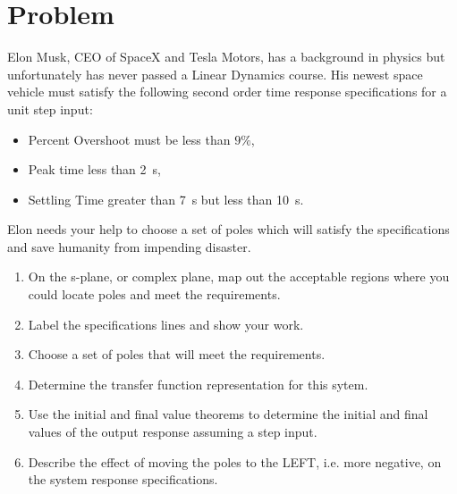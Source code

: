 \documentclass[titlepage, 11pt, reqno]{article}    %
\begin{document}
\section{Problem}\label{prob:sys_response_to_poles}
Elon Musk, CEO of SpaceX and Tesla Motors, has a background in physics but unfortunately has never passed a Linear Dynamics course. 
His newest space vehicle must satisfy the following second order time response specifications for a unit step input:
\begin{itemize}
    \item Percent Overshoot must be less than \(9 \%\),
    \item Peak time less than \SI{2}{\second},
    \item Settling Time greater than \SI{7}{\second} but less than \SI{10}{\second}.
\end{itemize}
Elon needs your help to choose a set of poles which will satisfy the specifications and save humanity from impending disaster.
\begin{enumerate}
    \item On the s-plane, or complex plane, map out the acceptable regions where you could locate poles and meet the requirements. 
    \item Label the specifications lines and show your work.
    \item Choose a set of poles that will meet the requirements.
    \item Determine the transfer function representation for this sytem.
    \item Use the initial and final value theorems to determine the initial and final values of the output response assuming a step input.
    \item Describe the effect of moving the poles to the LEFT, i.e. more negative, on the system response specifications.
\end{enumerate}

\begin{figure*}[htbp]
\centering
\begin{scaletikzpicturetowidth}{0.95\textwidth}
\end{scaletikzpicturetowidth}
\end{figure*}
\end{document}
